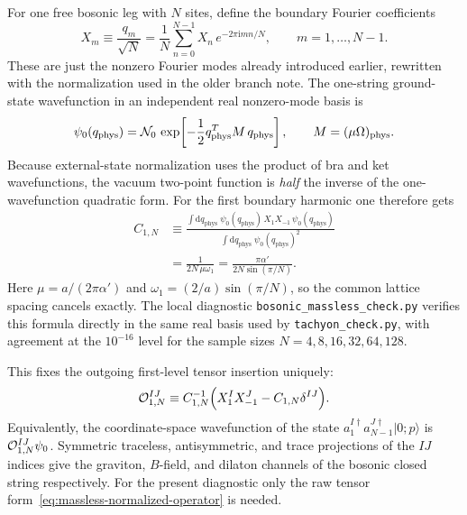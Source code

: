 \documentclass[11pt]{article}
\numberwithin{equation}{section}
\newcommand{\ii}{\mathrm{i}}
\newcommand{\dd}{\mathrm{d}}
\begin{document}
For one free bosonic leg with $N$ sites, define the boundary Fourier coefficients
\begin{equation}
\label{eq:s12-2-001}
X_m \equiv \frac{q_m}{\sqrt N}
=
\frac{1}{N}\sum_{n=0}^{N-1} X_n\,e^{-2\pi \ii mn/N},
\qquad
m=1,\dots,N-1.
\end{equation}
These are just the nonzero Fourier modes already introduced earlier, rewritten with the normalization used in the older branch note. The one-string ground-state wavefunction in an independent real nonzero-mode basis is
\begin{equation}
\label{eq:s12-2-002}
\psi_0(q_{\mathrm{phys}})
=
{\cal N}_0\,
\exp\!\left[-\frac12 q_{\mathrm{phys}}^T M\,q_{\mathrm{phys}}\right],
\qquad
M=(\mu\Omega)_{\mathrm{phys}}.
\end{equation}
Because external-state normalization uses the product of bra and ket wavefunctions, the vacuum two-point function is \emph{half} the inverse of the one-wavefunction quadratic form. For the first boundary harmonic one therefore gets
\begin{equation}
\label{eq:s12-2-003}
\begin{aligned}
C_{1,N}
&\equiv
\frac{\int \dd q_{\mathrm{phys}}\;
\psi_0(q_{\mathrm{phys}})
\,X_1 X_{-1}\,
\psi_0(q_{\mathrm{phys}})}
{\int \dd q_{\mathrm{phys}}\;
\psi_0(q_{\mathrm{phys}})^2}\\
&=
\frac{1}{2N\,\mu\omega_1}
=
\frac{\pi\alpha'}{2N\sin(\pi/N)}.
\end{aligned}
\end{equation}
Here $\mu=a/(2\pi\alpha')$ and $\omega_1=(2/a)\sin(\pi/N)$, so the common lattice spacing cancels exactly. The local diagnostic \texttt{bosonic\_massless\_check.py} verifies this formula directly in the same real basis used by \texttt{tachyon\_check.py}, with agreement at the $10^{-16}$ level for the sample sizes $N=4,8,16,32,64,128$.

This fixes the outgoing first-level tensor insertion uniquely:
\begin{equation}
{\cal O}_{1,N}^{IJ}
\equiv
C_{1,N}^{-1}\Bigl(X_1^I X_{-1}^J - C_{1,N}\delta^{IJ}\Bigr).
\label{eq:massless-normalized-operator}
\end{equation}
Equivalently, the coordinate-space wavefunction of the state
$a_1^{I\dagger}a_{N-1}^{J\dagger}|0;p\rangle$
is ${\cal O}_{1,N}^{IJ}\psi_0$. Symmetric traceless, antisymmetric, and trace projections of the $IJ$ indices give the graviton, $B$-field, and dilaton channels of the bosonic closed string respectively. For the present diagnostic only the raw tensor form~\eqref{eq:massless-normalized-operator} is needed.
\end{document}
